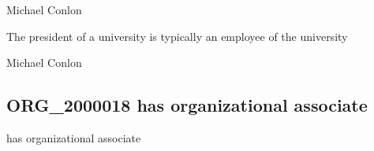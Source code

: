 \documentclass[letterpaper,10pt,english]{sphinxmanual}
\begin{document}
\begin{sphinxShadowBox}

\sphinxAtStartPar
Michael Conlon 
\end{sphinxShadowBox}

\begin{sphinxShadowBox}

\sphinxAtStartPar
{\hyperref[\detokenize{doc-NCBITaxon_9606::doc}]{}}
\end{sphinxShadowBox}

\begin{sphinxShadowBox}

\sphinxAtStartPar
{\hyperref[\detokenize{doc-ORG_0000001::doc}]{}}
\end{sphinxShadowBox}

\begin{sphinxShadowBox}

\sphinxAtStartPar
The president of a university is typically an employee of the university
\end{sphinxShadowBox}

\begin{sphinxShadowBox}

\sphinxAtStartPar
{}
\end{sphinxShadowBox}

\begin{sphinxShadowBox}

\sphinxAtStartPar
Michael Conlon 
\end{sphinxShadowBox}
\begin{quote}

\ignorespaces \end{quote}


\subsection{ORG\_2000018 \sphinxhyphen{} has organizational associate}
\label{\detokenize{doc-ORG_2000018:org-2000018-has-organizational-associate}}\label{\detokenize{doc-ORG_2000018:index-0}}\label{\detokenize{doc-ORG_2000018::doc}}
\begin{sphinxShadowBox}

\sphinxAtStartPar
has organizational associate
\end{sphinxShadowBox}
\end{document}

